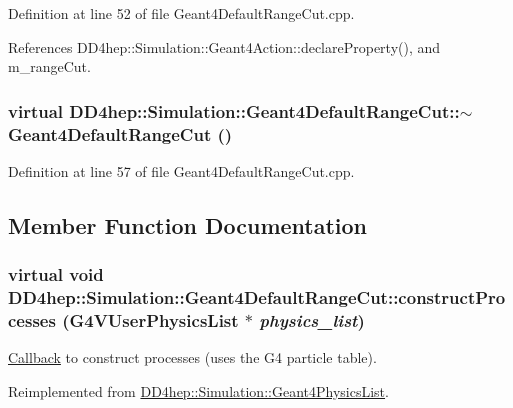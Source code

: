 Definition at line 52 of file Geant4DefaultRangeCut.cpp.

References DD4hep::Simulation::Geant4Action::declareProperty(), and m\_\-rangeCut.\hypertarget{class_d_d4hep_1_1_simulation_1_1_geant4_default_range_cut_a32d4c8eb8988913c4ed1c8ad6e2ab893}{
\subsubsection[{$\sim$Geant4DefaultRangeCut}]{\setlength{\rightskip}{0pt plus 5cm}virtual DD4hep::Simulation::Geant4DefaultRangeCut::$\sim$Geant4DefaultRangeCut ()}}
\label{class_d_d4hep_1_1_simulation_1_1_geant4_default_range_cut_a32d4c8eb8988913c4ed1c8ad6e2ab893}


Definition at line 57 of file Geant4DefaultRangeCut.cpp.

\subsection{Member Function Documentation}
\hypertarget{class_d_d4hep_1_1_simulation_1_1_geant4_default_range_cut_a5625f1bf8f0c47bb6b29c73ce3e590eb}{
\subsubsection[{constructProcesses}]{\setlength{\rightskip}{0pt plus 5cm}virtual void DD4hep::Simulation::Geant4DefaultRangeCut::constructProcesses (G4VUserPhysicsList $\ast$ {\em physics\_\-list})}}
\label{class_d_d4hep_1_1_simulation_1_1_geant4_default_range_cut_a5625f1bf8f0c47bb6b29c73ce3e590eb}


\hyperlink{class_d_d4hep_1_1_callback}{Callback} to construct processes (uses the G4 particle table). 

Reimplemented from \hyperlink{class_d_d4hep_1_1_simulation_1_1_geant4_physics_list_ae769a12f86a3cb785c1e040c5a32d8fb}{DD4hep::Simulation::Geant4PhysicsList}.


